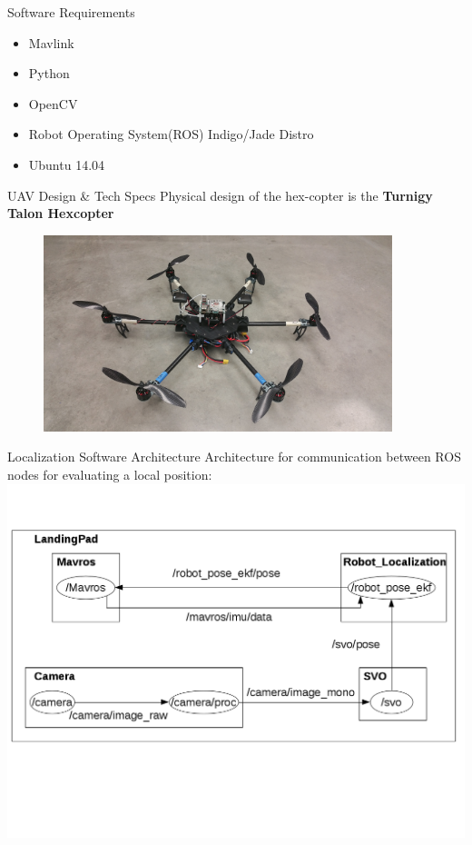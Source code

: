 \documentclass[11pt]{beamer}
\begin{document}
\begin{frame}{Software Requirements}
\begin{itemize}
\item Mavlink
\item Python
\item OpenCV
\item Robot Operating System(ROS) Indigo/Jade Distro
\item Ubuntu 14.04
\end{itemize}

\end{frame}



\begin{frame}{UAV Design \& Tech Specs}
	Physical design of the hex-copter is the \textbf{Turnigy Talon Hexcopter}
	
	\begin{figure}
		\includegraphics[width=4in]{images/TalonV1.jpg}
	\end{figure}

\end{frame}

\begin{frame}{Localization Software Architecture}
	Architecture for communication between ROS nodes for evaluating a local position: \\
	\centering
	\includegraphics[width=.9\textwidth]{images/localization.png}
\end{frame}
\end{document}
